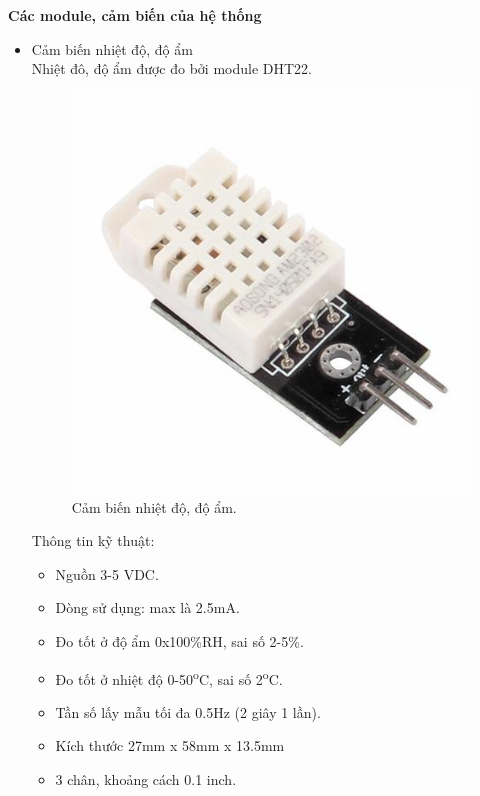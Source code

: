 \documentclass[a4paper,12pt,oneside]{article}
\begin{document}
\noindent \textbf{Các module, cảm biến của hệ thống}
\begin{itemize}

\item Cảm biến nhiệt độ, độ ẩm\\
\noindent Nhiệt đô, độ ẩm được đo bởi module DHT22.
\begin{center}
\begin{figure}[htp]
\begin{center}
\includegraphics[scale=.3]{hinh/DHT22.jpg}
\end{center}
\caption{Cảm biến nhiệt độ, độ ẩm.}

\end{figure}
\end{center}

\noindent Thông tin kỹ thuật:
\begin{itemize}
\item Nguồn 3-5 VDC.
\item Dòng sử dụng: max là 2.5mA.
\item Đo tốt ở độ ẩm 0x100\%RH, sai số 2-5\%.
\item Đo tốt ở nhiệt độ 0-50\textsuperscript{o}C, sai số 2\textsuperscript{o}C.
\item Tần số lấy mẫu tối đa 0.5Hz (2 giây 1 lần).
\item Kích thước 27mm x 58mm x 13.5mm
\item 3 chân, khoảng cách 0.1 inch.
\end{itemize}



\end{itemize}
\end{document}
